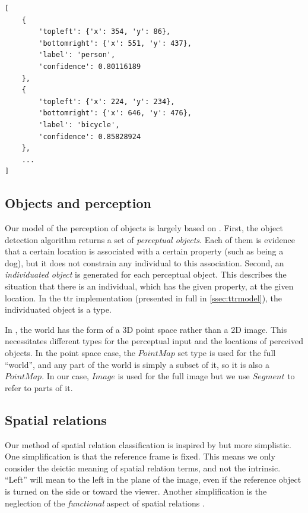 \begin{lstlisting}[label=lst:yolo_out, caption=Example output of YOLO invocation]
[
	{
		'topleft': {'x': 354, 'y': 86},
		'bottomright': {'x': 551, 'y': 437},
		'label': 'person',
		'confidence': 0.80116189
	},
	{
		'topleft': {'x': 224, 'y': 234},
		'bottomright': {'x': 646, 'y': 476},
		'label': 'bicycle',
		'confidence': 0.85828924
	},
	...
]
\end{lstlisting}



\subsection{Objects and perception}

Our model of the perception of objects is largely based on \cite{lspc}.
First, the object detection algorithm returns a set of \textit{perceptual objects}.
Each of them is evidence that a certain location is associated with a certain property (such as being a dog), but it does not constrain any individual to this association.
Second, an \textit{individuated object} is generated for each perceptual object.
This describes the situation that there is an individual, which has the given property, at the given location.
In the \gls{ttr} implementation (presented in full in \autoref{ssec:ttrmodel}), the individuated object is a type.

In \cite{lspc}, the world has the form of a 3D point space rather than a 2D image.
This necessitates different types for the perceptual input and the locations of perceived objects.
In the point space case, the $PointMap$ set type is used for the full ``world'', and any part of the world is simply a subset of it, so it is also a $PointMap$.
In our case, $Image$ is used for the full image but we use $Segment$ to refer to parts of it.



\subsection{Spatial relations}
\label{sec:method-spatrel}

Our method of spatial relation classification is inspired by \cite{ttrspat} but more simplistic.
One simplification is that the reference frame is fixed.
This means we only consider the deictic meaning of spatial relation terms, and not the intrinsic.
``Left'' will mean to the left in the plane of the image, even if the reference object is turned on the side or toward the viewer.
Another simplification is the neglection of the \textit{functional} aspect of spatial relations \citep{CoventryInterplayGeometryFunction2001}.


